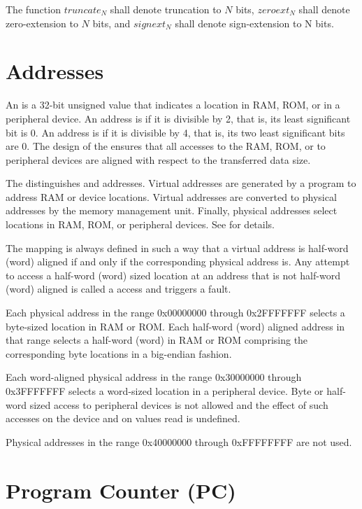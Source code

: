 The function $truncate_N$ shall denote truncation to $N$ bits, $zeroext_N$ shall denote zero-extension to $N$ bits, and $signext_N$ shall denote sign-extension to N bits.

\section{Addresses}

An  is a 32-bit unsigned value that indicates a location in RAM, ROM, or in a peripheral device. An address is  if it is divisible by 2, that is, its least significant bit is 0. An address is  if it is divisible by 4, that is, its two least significant bits are 0. The design of the \eco ensures that all accesses to the RAM, ROM, or to peripheral devices are aligned with respect to the transferred data size.

The \eco distinguishes  and  addresses. Virtual addresses are generated by a program to address RAM or device locations. Virtual addresses are converted to physical addresses by the memory management unit. Finally, physical addresses select locations in RAM, ROM, or peripheral devices. See  for details.

The mapping is always defined in such a way that a virtual address is half-word (word) aligned if and only if the corresponding physical address is. Any attempt to access a half-word (word) sized location at an address that is not half-word (word) aligned is called a  access and triggers a fault.

Each physical address in the range 0x00000000 through 0x2FFFFFFF selects a byte-sized location in RAM or ROM. Each half-word (word) aligned address in that range selects a half-word (word) in RAM or ROM comprising the corresponding byte locations in a big-endian fashion.

Each word-aligned physical address in the range 0x30000000 through 0x3FFFFFFF selects a word-sized location in a peripheral device. Byte or half-word sized access to peripheral devices is not allowed and the effect of such accesses on the device and on values read is undefined.

Physical addresses in the range 0x40000000 through 0xFFFFFFFF are not used.

\section{Program Counter (PC)}


